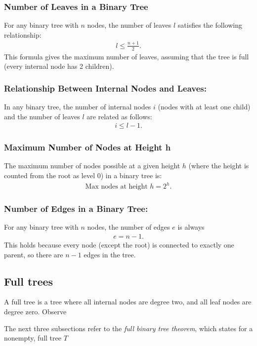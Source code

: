 \documentclass{report}
\begin{document}
\bigbreak \noindent 
\subsubsection{Number of Leaves in a Binary Tree}
\bigbreak \noindent 
For any binary tree with $n$ nodes, the number of leaves $l$ satisfies the following relationship:
\begin{align*}
    l \leq \frac{n+1}{2}
.\end{align*}
\bigbreak \noindent 
This formula gives the maximum number of leaves, assuming that the tree is full (every internal node has 2 children).

\bigbreak \noindent 
\subsubsection{Relationship Between Internal Nodes and Leaves:}
\bigbreak \noindent 
In any binary tree, the number of internal nodes $i$ (nodes with at least one child) and the number of leaves $l$ are related as follows:
\begin{align*}
    i \leq l-1
.\end{align*}

\bigbreak \noindent 
\subsubsection{Maximum Number of Nodes at Height h}
\bigbreak \noindent 
The maximum number of nodes possible at a given height $h$ (where the height is counted from the root as level 0) in a binary tree is:
\begin{align*}
    \text{Max nodes at height $h$} = 2^{h}
.\end{align*}

\pagebreak 
\subsubsection{Number of Edges in a Binary Tree:}
\bigbreak \noindent 
For any binary tree with $n$ nodes, the number of edges $e$ is always
\begin{align*}
    e = n-1
.\end{align*}
\bigbreak \noindent 
This holds because every node (except the root) is connected to exactly one parent, so there are $n−1$ edges in the tree.

\pagebreak 
\subsection{Full trees}
\bigbreak \noindent 
A full tree is a tree where all internal nodes are degree two, and all leaf nodes are degree zero. Observe
\bigbreak \noindent 
\begin{figure}[ht]
    \centering
    \label{fig:fulltree1}
\end{figure}
\bigbreak \noindent 
The next three subsections refer to the \textit{full binary tree theorem}, which states for a nonempty, full tree $T$ 
\bigbreak \noindent 
\end{document}
